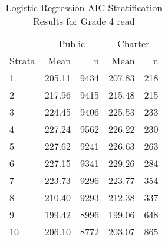 \begin{table}[ht]
\centering
\caption{Logistic Regression AIC Stratification Results for Grade 4 read} 
\label{g4read-circpsa10AIC}
\begin{tabular}{lrr@{\extracolsep{.2cm}}rr}
  \hline
   & \multicolumn{2}{c}{Public} & \multicolumn{2}{c}{Charter} \\ \cline{2-3} \cline{4-5} Strata & Mean & n & Mean & n \\ \hline
1 & 205.11 & 9434 & 207.83 & 218 \\ 
  2 & 217.96 & 9415 & 215.48 & 215 \\ 
  3 & 224.45 & 9406 & 225.53 & 233 \\ 
  4 & 227.24 & 9562 & 226.22 & 230 \\ 
  5 & 227.62 & 9241 & 226.63 & 263 \\ 
  6 & 227.15 & 9341 & 229.26 & 284 \\ 
  7 & 223.73 & 9296 & 223.77 & 354 \\ 
  8 & 210.40 & 9293 & 212.38 & 337 \\ 
  9 & 199.42 & 8996 & 199.06 & 648 \\ 
  10 & 206.10 & 8772 & 203.07 & 865 \\ 
   \hline
\end{tabular}
\end{table}
